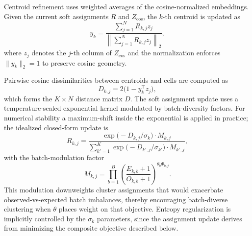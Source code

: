 \documentclass{article}
\begin{document}
Centroid refinement uses weighted averages of the cosine-normalized embeddings. Given the current soft assignments $R$ and $Z_{\mathrm{cos}}$, the $k$-th centroid is updated as
\begin{equation}
    y_k = \frac{\sum_{j=1}^N R_{k,j} z_j}{\left\| \sum_{j=1}^N R_{k,j} z_j \right\|_2},
\end{equation}
where $z_j$ denotes the $j$-th column of $Z_{\mathrm{cos}}$ and the normalization enforces $\|y_k\|_2 = 1$ to preserve cosine geometry.

Pairwise cosine dissimilarities between centroids and cells are computed as
\begin{equation}
    D_{k,j} = 2 \bigl(1 - y_k^\top z_j \bigr),
\end{equation}
which forms the $K \times N$ distance matrix $D$. The soft assignment update uses a temperature-scaled exponential kernel modulated by batch-diversity factors. For numerical stability a maximum-shift inside the exponential is applied in practice; the idealized closed-form update is
\begin{equation}
    R_{k,j} = \frac{\exp\bigl(-D_{k,j} / \sigma_k\bigr) \cdot M_{k,j}}{\sum_{k'=1}^K \exp\bigl(-D_{k',j} / \sigma_{k'}\bigr) \cdot M_{k',j}},
\end{equation}
with the batch-modulation factor
\begin{equation}
    M_{k,j} = \prod_{b=1}^B \left( \frac{E_{k,b} + 1}{O_{k,b} + 1} \right)^{\theta_b \Phi_{b,j}}.
\end{equation}
This modulation downweights cluster assignments that would exacerbate observed-vs-expected batch imbalances, thereby encouraging batch-diverse clustering when $\theta$ places weight on that objective. Entropy regularization is implicitly controlled by the $\sigma_k$ parameters, since the assignment update derives from minimizing the composite objective described below.
\end{document}
